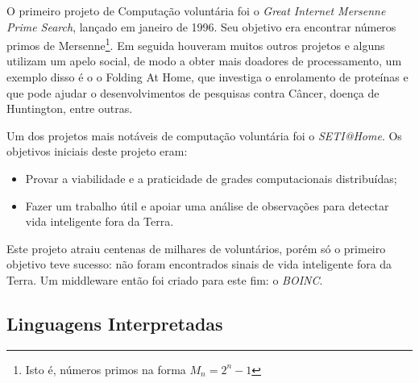 \documentclass[a4paper,12pt,titlepage]{article}
\begin{document}
O primeiro projeto de Computação voluntária foi o \textit{Great Internet Mersenne Prime Search}, lançado em janeiro de 1996. 
Seu objetivo era encontrar números primos de Mersenne\footnote{Isto é, números primos na forma $M_n = 2^n - 1$}. Em seguida houveram 
muitos outros projetos e alguns utilizam um apelo social, de modo a obter mais doadores de processamento, um exemplo disso é o
o Folding At Home, que investiga o enrolamento de proteínas e que pode ajudar o desenvolvimentos de pesquisas contra 
Câncer, doença de Huntington, entre outras. 

Um dos projetos mais notáveis de computação voluntária foi o \textit{SETI@Home}. Os objetivos iniciais deste projeto eram: 

\begin{itemize}
  \item Provar a viabilidade e a praticidade de grades computacionais distribuídas;
  \item Fazer um trabalho útil e apoiar uma análise de observações para detectar vida inteligente fora da Terra.
\end{itemize}

Este projeto atraiu centenas de milhares de voluntários, porém só o primeiro objetivo teve sucesso: não foram encontrados sinais 
de vida inteligente fora da Terra. Um middleware então foi criado para este fim: o \textit{BOINC}. 

\subsection{Linguagens Interpretadas}
\end{document}
